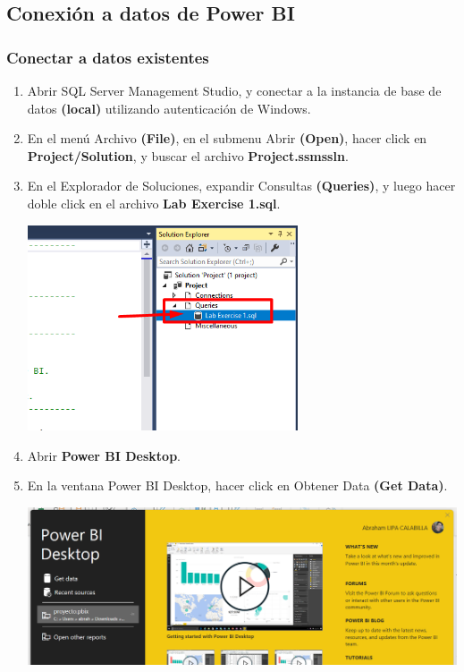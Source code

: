 \documentclass[12pt,letterpaper]{article}
\newcommand\tab[1][1cm]{\hspace*{#1}}
\begin{document}
    \subsection{Conexión a datos de Power BI}
    \subsubsection{Conectar a datos existentes}
    \begin{enumerate}[\tab 1.]
        \item Abrir SQL Server Management Studio, y conectar a la instancia de base de datos \textbf{(local)} utilizando autenticación de Windows.
        \item En el menú Archivo \textbf{(File)}, en el submenu Abrir \textbf{(Open)}, hacer click en \textbf{Project/Solution}, y buscar el archivo \textbf{Project.ssmssln}.
        \item En el Explorador de Soluciones, expandir Consultas \textbf{(Queries)}, y luego hacer doble click en el archivo \textbf{Lab Exercise 1.sql}.
        \begin{center}
            \includegraphics[width=8cm]{./img/img3.png}
        \end{center}
        \item Abrir \textbf{Power BI Desktop}.
        \item En la ventana Power BI Desktop, hacer click en Obtener Data \textbf{(Get Data)}.
        \begin{center}
            \includegraphics[width=13cm]{./img/img5.png}

\end{center}
\end{enumerate}
\end{document}
